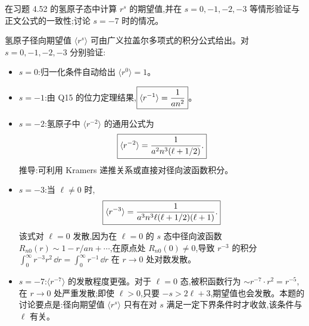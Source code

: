 \begin{question}
在习题 4.52 的氢原子态中计算 $r^s$ 的期望值,并在 $s=0,-1,-2,-3$ 等情形验证与正文公式的一致性;讨论 $s=-7$ 时的情况。
\begin{solution}
氢原子径向期望值 $\langle r^s\rangle$ 可由广义拉盖尔多项式的积分公式给出。对 $s=0,-1,-2,-3$ 分别验证:

\begin{itemize}
\item $s=0$:归一化条件自动给出 $\boxed{\langle r^0\rangle=1}$。
\item $s=-1$:由 Q15 的位力定理结果,$\boxed{\langle r^{-1}\rangle={1\over an^2}}$。
\item $s=-2$:氢原子中 $\langle r^{-2}\rangle$ 的通用公式为
\[
\boxed{\langle r^{-2}\rangle={1\over a^2 n^3(\ell+1/2)}.}
\]
推导:可利用 Kramers 递推关系或直接对径向波函数积分。
\item $s=-3$:当 $\ell\ne0$ 时,
\[
\boxed{\langle r^{-3}\rangle={1\over a^3 n^3\ell(\ell+1/2)(\ell+1)}.}
\]
该式对 $\ell=0$ 发散,因为在 $\ell=0$ 的 $s$ 态中径向波函数 $R_{n0}(r)\sim 1- r/a n + \cdots$,在原点处 $R_{n0}(0)\ne0$,导致 $r^{-3}$ 的积分 $\int_0^\infty r^{-3} r^2\,\dd r = \int_0^\infty r^{-1}\,\dd r$ 在 $r\to0$ 处对数发散。

\item $s=-7$:$\langle r^{-7}\rangle$ 的发散程度更强。对于 $\ell=0$ 态,被积函数行为 $\sim r^{-7}\cdot r^2 = r^{-5}$,在 $r\to0$ 处严重发散;即使 $\ell>0$,只要 $-s > 2\ell+3$,期望值也会发散。本题的讨论要点是:径向期望值 $\langle r^s\rangle$ 只有在对 $s$ 满足一定下界条件时才收敛,该条件与 $\ell$ 有关。
\end{itemize}
\end{solution}
\end{question}

